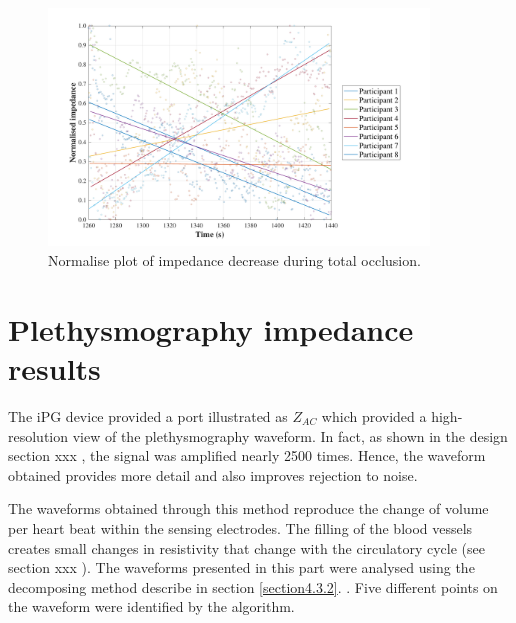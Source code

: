 \begin{figure}[!htbp]
	\centering
	\includegraphics[width=0.9\textwidth,height=0.9\textheight,keepaspectratio]{figure5}    
	\caption{Normalise plot of impedance decrease during total occlusion.}
	\label{fig:normalise:total_occlusion}
\end{figure}


\section{Plethysmography impedance results}
\label{section results 3}
The iPG device provided a port illustrated as $Z_{AC}$  which provided a high-resolution view of the plethysmography waveform.  In fact, as shown in the design section xxx , the signal was amplified nearly 2500 times. Hence, the waveform obtained provides more detail and also improves rejection to noise.

The waveforms obtained through this method reproduce the change of volume per heart beat within the sensing electrodes. The filling of the blood vessels creates small changes in resistivity that change with the circulatory cycle (see section xxx ). The waveforms presented in this part were analysed using the decomposing method describe in section \ref{section4.3.2}. . Five different points on the waveform were identified by the algorithm.

